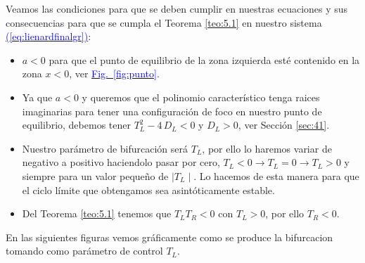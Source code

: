 \documentclass[12pt,a4paper]{report} %
\newcommand{\fref}[1]{\hyperref[#1]{\textcolor{blue}{Fig.~\ref*{#1}}}}
\newcommand{\eref}[1]{\hyperref[#1]{\textcolor{blue}{(\ref*{#1})}}}
\newcommand{\fref}[1]{\hyperref[#1]{\textcolor{blue}{\textit{Fig.~\ref*{#1}}}}}
\newcommand{\eref}[1]{\hyperref[#1]{\textcolor{blue}{\textit{(\ref*{#1})}}}}
\begin{document}
	Veamos las condiciones para que se deben cumplir en nuestras ecuaciones y sus consecuencias para que se cumpla el Teorema \ref{teo:5.1} en nuestro sistema \eref{eq:lienardfinalgr}:
		\begin{itemize}
			\item $a<0$ para que el punto de equilibrio de la zona izquierda esté contenido en la zona $x<0$, ver \fref{fig:punto}.
			\item Ya que $a<0$ y queremos que el polinomio característico  tenga raices imaginarias para tener una configuración de foco en nuestro punto de equilibrio, debemos tener $T_L^2-4\,D_L<0$ y $D_L>0$, ver Sección \ref{sec:41}.

			\item Nuestro parámetro de bifurcación será $T_L$, por ello lo haremos variar de negativo a positivo haciendolo pasar por cero, $T_L<0 \rightarrow T_L=0 \rightarrow T_L>0$ y siempre para un valor pequeño de $\mid T_L \mid$. Lo hacemos de esta manera para que el ciclo límite que obtengamos sea asintóticamente estable.
			\item Del Teorema \ref{teo:5.1} tenemos que $T_LT_R<0$ con $T_L>0$, por ello  $T_R<0$.
		\end{itemize}
		
		
	\vspace{0.5cm} En las siguientes figuras vemos gráficamente como se produce la bifurcacion tomando como parámetro de control $T_L$.
		
	\newpage
	
\end{document}
